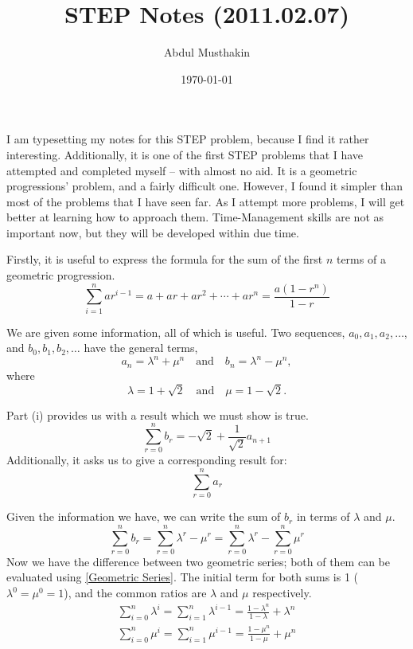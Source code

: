 \documentclass[12pt]{article}
\title{STEP Notes (2011.02.07)}
\author{Abdul Musthakin}
\date{\today}
\begin{document}
\maketitle

I am typesetting my notes for this STEP problem, because I find it rather interesting.
Additionally, it is one of the first STEP problems that I have attempted and completed myself -- with almost no aid.
It is a geometric progressions' problem, and a fairly difficult one.
However, I found it simpler than most of the problems that I have seen far.
As I attempt more problems, I will get better at learning how to approach them.
Time-Management skills are not as important now, but they will be developed within due time.

Firstly, it is useful to express the formula for the sum of the first $n$ terms of a geometric progression.
\begin{equation}
    \sum_{i=1}^n ar^{i-1} = a + ar + ar^2 + \cdots + ar^n = \frac{a(1-r^n)}{1-r} \label{Geometric Series}
\end{equation}

We are given some information, all of which is useful.
Two sequences, $a_0, a_1, a_2, \ldots$, and $b_0, b_1, b_2, \ldots$ have the general terms,
\begin{equation*}
    a_n = \lambda^n + \mu^n \quad \text{and} \quad b_n = \lambda^n - \mu^n,
\end{equation*}
where
\begin{equation*}
    \lambda = 1 + \sqrt{2} \quad \text{and} \quad \mu = 1 - \sqrt{2}.
\end{equation*}

Part (i) provides us with a result which we must show is true.
\begin{equation}
    \sum_{r=0}^{n} b_r = -\sqrt{2} + \frac{1}{\sqrt{2}} a_{n+1}
\end{equation}
Additionally, it asks us to give a corresponding result for:
\begin{equation*}
    \sum_{r=0}^{n} a_r
\end{equation*}

Given the information we have, we can write the sum of $b_r$ in terms of $\lambda$ and $\mu$.
\begin{equation*}
    \sum_{r=0}^{n} b_r = \sum_{r=0}^{n} \lambda^r - \mu^r = \sum_{r=0}^{n} \lambda^r - \sum_{r=0}^{n} \mu^r
\end{equation*}
Now we have the difference between two geometric series; both of them can be evaluated using \eqref{Geometric Series}.
The initial term for both sums is 1 ($\lambda^0=\mu^0=1$), and the common ratios are $\lambda$ and $\mu$ respectively.
\begin{align}
    \sum_{i=0}^{n} \lambda^i = \sum_{i=1}^{n} \lambda^{i-1} = \frac{1-\lambda^n}{1-\lambda} + \lambda^n \\
    \sum_{i=0}^{n} \mu^i = \sum_{i=1}^{n} \mu^{i-1} = \frac{1-\mu^n}{1-\mu} + \mu^n
\end{align}
\end{document}
